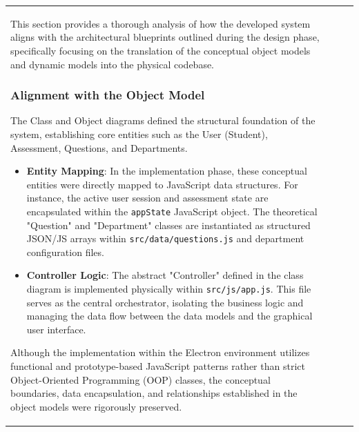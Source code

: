 \documentclass[12pt, a4paper]{article}
\begin{document}
\begin{itemize}[leftmargin=1.5em, itemsep=3pt]
\begin{table}[H]
\begin{tabularx}{\textwidth}{>{\raggedright\arraybackslash}p{0.8cm}>{\raggedright\arraybackslash}p{3.5cm}>{\raggedright\arraybackslash}X>{\raggedright\arraybackslash}p{2.5cm}}
This section provides a thorough analysis of how the developed system aligns with the architectural blueprints outlined during the design phase, specifically focusing on the translation of the conceptual object models and dynamic models into the physical codebase.

\subsubsection{Alignment with the Object Model}
The Class and Object diagrams defined the structural foundation of the system, establishing core entities such as the User (Student), Assessment, Questions, and Departments. 
\begin{itemize}[leftmargin=1.5em, itemsep=3pt]
    \item \textbf{Entity Mapping}: In the implementation phase, these conceptual entities were directly mapped to JavaScript data structures. For instance, the active user session and assessment state are encapsulated within the \texttt{appState} JavaScript object. The theoretical "Question" and "Department" classes are instantiated as structured JSON/JS arrays within \texttt{src/data/questions.js} and department configuration files.
    \item \textbf{Controller Logic}: The abstract "Controller" defined in the class diagram is implemented physically within \texttt{src/js/app.js}. This file serves as the central orchestrator, isolating the business logic and managing the data flow between the data models and the graphical user interface.
\end{itemize}
Although the implementation within the Electron environment utilizes functional and prototype-based JavaScript patterns rather than strict Object-Oriented Programming (OOP) classes, the conceptual boundaries, data encapsulation, and relationships established in the object models were rigorously preserved.


\end{tabularx}
\end{table}
\end{itemize}
\end{document}
